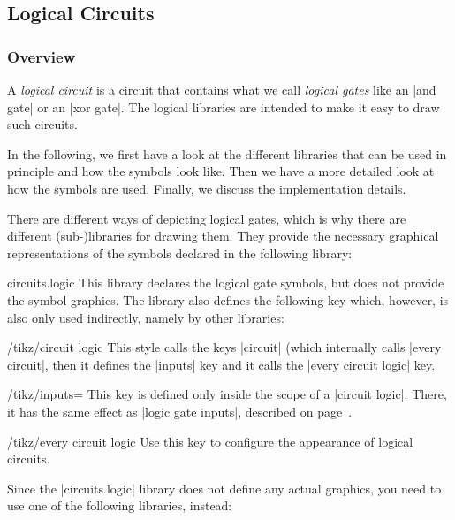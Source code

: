 \subsection{Logical Circuits}

\subsubsection{Overview}

A \emph{logical circuit} is a circuit that contains what we call \emph{logical
gates} like an |and gate| or an |xor gate|. The logical libraries are intended
to make it easy to draw such circuits.

In the following, we first have a look at the different libraries that can be
used in principle and how the symbols look like. Then we have a more detailed
look at how the symbols are used. Finally, we discuss the implementation
details.

There are different ways of depicting logical gates, which is why there are
different (sub-)libraries for drawing them. They provide the necessary
graphical representations of the symbols declared in the following library:

\begin{tikzlibrary}{circuits.logic}
    This library declares the logical gate symbols, but does not provide the
    symbol graphics. The library also defines the following key which, however,
    is also only used indirectly, namely by other libraries:
    \begin{key}{/tikz/circuit logic}
        This style calls the keys |circuit| (which internally calls
        |every circuit|, then it defines the |inputs| key and it calls the
        |every circuit logic| key.
        \begin{key}{/tikz/inputs=}
            This key is defined only inside the scope of a |circuit logic|.
            There, it has the same effect as |logic gate inputs|, described on
            page~\pageref{logic-gate-inputs}.
        \end{key}
        \begin{stylekey}{/tikz/every circuit logic}
            Use this key to configure the appearance of logical circuits.
        \end{stylekey}
    \end{key}
\end{tikzlibrary}

Since the |circuits.logic| library does not define any actual graphics, you need
to use one of the following libraries, instead:

